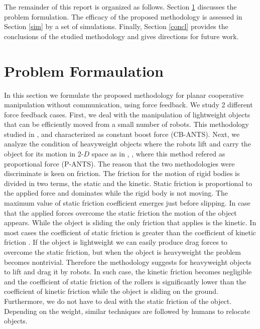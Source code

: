 \documentclass[letterpaper, 10 pt, conference]{ieeeconf}
\begin{document}
The remainder of this report is organized as follows. Section \ref{pf} discusses the problem formulation. The efficacy of the proposed methodology is assessed in Section \ref{sim} by a set of simulations. Finally, Section \ref{concl} provides the conclusions of the studied methodology and gives directions for future work.


\section{Problem Formaulation}\label{pf}
In this section we formulate the proposed methodology for planar cooperative manipulation without communication, using force feedback. We study 2 different force feedback cases. First, we deal with the manipulation of lightweight objects that can be efficiently moved from a small number of robots. This methodology studied in   \cite{wang2016force}, \cite{wang2016kinematic} and characterized as constant boost force (CB-ANTS). Next, we analyze the condition of heavyweight objects where the robots lift and carry the object for its motion in 2-$D$ space as in \cite{wang2015multi}, \cite{wang2016force}, where this method refered as proportional force (P-ANTS). The reason that the two methodologies were discriminate is keen on friction. The friction for the motion of rigid bodies is divided in two terms, the static and the kinetic. Static friction is proportional to the applied force and dominates while the rigid body is not moving. The maximum value of static friction coefficient emerges just before slipping. In case that the applied forces overcome the static friction the motion of the object appears. While the object is sliding the only friction that applies is the kinetic. In most cases the coefficient of static friction is greater than the coefficient of kinetic friction \cite{tipler2007physics}. If the object is lightweight we can easily produce drag forces to overcome the static friction, but when the object is heavyweight the problem becomes nontrivial. Therefore the methodology suggests for heavyweight objects to lift and drag it by robots. In such case, the kinetic friction becomes negligible and the coefficient of static friction of the rollers is significantly lower than the coefficient of kinetic friction while the object is sliding on the ground. Furthermore, we do not have to deal with the static friction of the object. Depending on the weight, similar techniques are followed by humans to relocate objects. 
\end{document}
